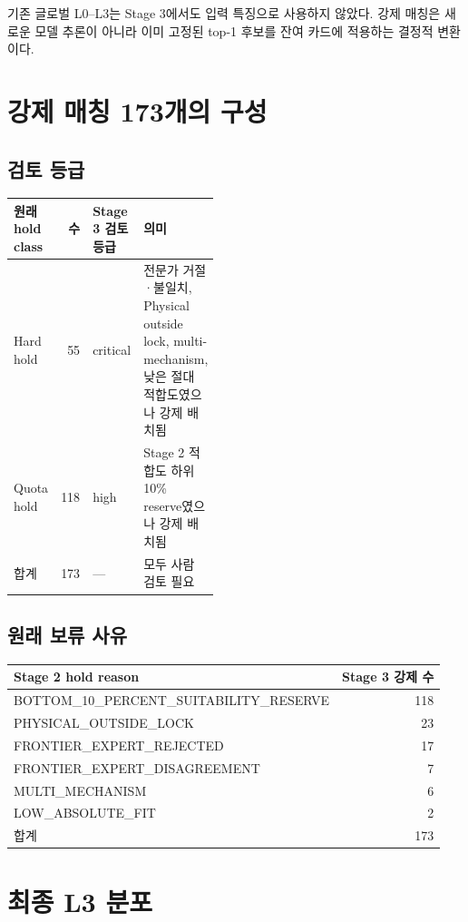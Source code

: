 \documentclass[11pt,a4paper]{article}
\begin{document}
기존 글로벌 L0--L3는 Stage 3에서도 입력 특징으로 사용하지 않았다. 강제 매칭은
새로운 모델 추론이 아니라 이미 고정된 top-1 후보를 잔여 카드에 적용하는 결정적 변환이다.

\section{강제 매칭 173개의 구성}

\subsection{검토 등급}

\begin{tabularx}{\linewidth}{p{0.22\linewidth}rp{0.23\linewidth}Y}
\toprule
원래 hold class & 수 & Stage 3 검토 등급 & 의미 \\
\midrule
Hard hold & 55 & critical & 전문가 거절·불일치, Physical outside lock, multi-mechanism, 낮은 절대 적합도였으나 강제 배치됨 \\
Quota hold & 118 & high & Stage 2 적합도 하위 10\% reserve였으나 강제 배치됨 \\
\midrule
합계 & 173 & --- & 모두 사람 검토 필요 \\
\bottomrule
\end{tabularx}

\subsection{원래 보류 사유}

\begin{longtable}{lr}
\toprule
Stage 2 hold reason & Stage 3 강제 수 \\
\midrule
\endhead
BOTTOM\_10\_PERCENT\_SUITABILITY\_RESERVE & 118 \\
PHYSICAL\_OUTSIDE\_LOCK & 23 \\
FRONTIER\_EXPERT\_REJECTED & 17 \\
FRONTIER\_EXPERT\_DISAGREEMENT & 7 \\
MULTI\_MECHANISM & 6 \\
LOW\_ABSOLUTE\_FIT & 2 \\
\midrule
합계 & 173 \\
\bottomrule
\end{longtable}

\section{최종 L3 분포}
\end{document}
